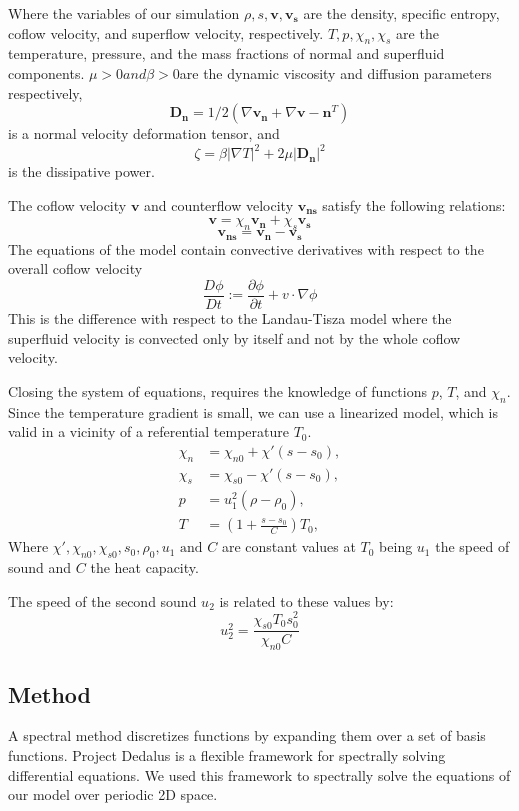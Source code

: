 \documentclass{article}
\begin{document}
Where the variables of our simulation  \(\rho, s, \mathbf{v}, \mathbf{v_s}\) are the density, specific entropy, coflow velocity, and superflow velocity, respectively.
\(T, p, \chi_n, \chi_s\) are the temperature, pressure, and the mass fractions of normal and superfluid components. 
\(\mu > 0 and \beta>0 \)are the dynamic viscosity and diffusion parameters respectively, 
\[\mathbf{D_n} = 1/2(\nabla \mathbf{v_n} +  \nabla \mathbf{v-n}^T)\] 
is a normal velocity deformation tensor, and
\[\zeta = \beta |\nabla T|^2 + 2 \mu |\mathbf{D_n}|^2\]
is the dissipative power.


The coflow velocity \(\mathbf{v}\) and counterflow velocity \( \mathbf{v_{ns}}\) satisfy the following relations:
\[\mathbf{v} = \chi_n \mathbf{v_n} + \chi_s \mathbf{v_s}\]
\[\mathbf{v_{ns}}  = \mathbf{v_n} - \mathbf{v_s}\]
The equations of the model contain convective derivatives with respect to the overall coflow velocity
\[\frac{D\phi}{Dt} := \frac{\partial \phi}{\partial t} + v \cdot \nabla \phi\]
This is the difference with respect to the Landau-Tisza model where the superfluid velocity is convected only by itself and not by the whole coflow velocity.

Closing the system of equations, requires the knowledge of functions \(p\), \(T\), and \(\chi_n\).
Since the temperature gradient is small, we can use a linearized model, which is valid in a vicinity of a referential temperature \(T_0\).
\begin{align}
    \chi_n &= \chi_{n0} + \chi'(s-s_0),\\
    \chi_s &= \chi_{s0} - \chi'(s-s_0),\\
    p &= u_1^2(\rho-\rho_0), \\
    T &= (1+\frac{s-s_0}{C})T_0,
\end{align}
Where \(\chi', \chi_{n0}, \chi_{s0}, s_0, \rho_0, u_1 \text{ and } C\) are constant values at \(T_0\) being 
\(u_1\) the speed of sound and \(C\) the heat capacity. 

The speed of the second sound \(u_2\) is related to these values by:
\[u_2^2 = \frac{\chi_{s0}T_0s_0^2}{\chi_{n0}C}\]
\subsection{Method}
A spectral method discretizes functions by expanding them over a set of basis functions.
Project Dedalus\cite{Dedalus} is a flexible framework for spectrally solving differential equations. We used this framework to spectrally solve the equations of our model over periodic 2D space.
\end{document}
